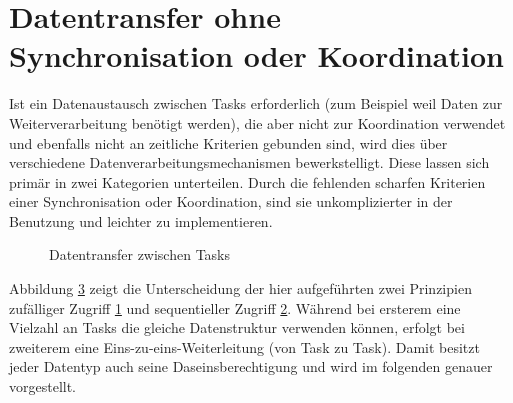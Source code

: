 \documentclass{llncs}
\begin{document}
\section{Datentransfer ohne Synchronisation oder Koordination}
\label{sub:Datentransfer_ohne_Sync_Koord}
Ist ein Datenaustausch zwischen Tasks erforderlich (zum Beispiel weil Daten zur Weiterverarbeitung benötigt werden), die aber nicht zur Koordination verwendet und ebenfalls nicht an zeitliche Kriterien gebunden sind, wird dies über verschiedene Datenverarbeitungsmechanismen bewerkstelligt. Diese lassen sich primär in zwei Kategorien unterteilen. Durch die fehlenden scharfen Kriterien einer Synchronisation oder Koordination, sind sie unkomplizierter in der Benutzung und leichter zu implementieren.
\begin{figure}
	\centering
	\begin{subfigure}[b]{.450\textwidth}
		\def\svgwidth{\columnwidth}
		
		\caption{\label{subfig:zufaelliger_Zugriff}}
	\end{subfigure}
	\hspace{3em}
	\begin{subfigure}[b]{.450\textwidth}
		\def\svgwidth{\columnwidth}
		
		\caption{\label{subfig:sequentiell_Zugriff}}
	\end{subfigure}
	\caption{\label{fig:Datentransfer_Ueberblick}Datentransfer zwischen Tasks \autocite[vgl.][95]{Cooling2017}}
\end{figure}

Abbildung \ref{fig:Datentransfer_Ueberblick} zeigt die Unterscheidung der hier aufgeführten zwei Prinzipien \glqq zufälliger Zugriff \grqq \ref{subfig:zufaelliger_Zugriff} und \glqq sequentieller Zugriff \grqq \ref{subfig:sequentiell_Zugriff}. Während bei ersterem eine Vielzahl an Tasks die gleiche Datenstruktur verwenden können, erfolgt bei zweiterem eine Eins-zu-eins-Weiterleitung (von Task zu Task). Damit besitzt jeder Datentyp auch seine Daseinsberechtigung und wird im folgenden genauer vorgestellt.
\end{document}
